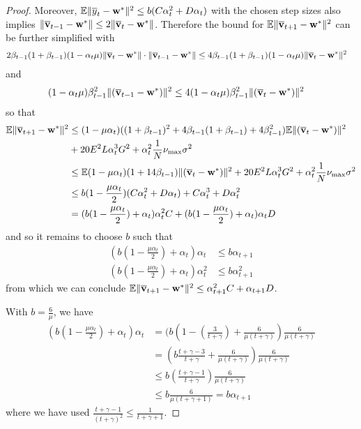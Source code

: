 \begin{proof}
Moreover, $\mathbb{E}\|\overline{y}_{t}-{\mathbf{w}}^{\ast}\|^{2}\leq b(C\alpha_{t}^{2}+D\alpha_{t})$
with the chosen step sizes also implies $\|{\overline{\mathbf{v}}}_{t-1}-{\mathbf{w}}^{\ast}\|\leq2\|{\overline{\mathbf{v}}}_{t}-{\mathbf{w}}^{\ast}\|$.
Therefore the bound for $\mathbb{E}\|{\overline{\mathbf{v}}}_{t+1}-{\mathbf{w}}^{\ast}\|^{2}$
can be further simplified with 
\begin{align*}
2\beta_{t-1}(1+\beta_{t-1})(1-\alpha_{t}\mu)\|{\overline{\mathbf{v}}}_{t}-{\mathbf{w}}^{\ast}\|\cdot\|{\overline{\mathbf{v}}}_{t-1}-{\mathbf{w}}^{\ast}\| & \leq4\beta_{t-1}(1+\beta_{t-1})(1-\alpha_{t}\mu)\|{\overline{\mathbf{v}}}_{t}-{\mathbf{w}}^{\ast}\|^{2}
\end{align*}
and 
\begin{align*}
(1-\alpha_{t}\mu)\beta_{t-1}^{2}\|({\overline{\mathbf{v}}}_{t-1}-{\mathbf{w}}^{\ast})\|^{2} & \leq4(1-\alpha_{t}\mu)\beta_{t-1}^{2}\|({\overline{\mathbf{v}}}_{t}-{\mathbf{w}}^{\ast})\|^{2}
\end{align*}
so that
\begin{align*}
\mathbb{E}\|{\overline{\mathbf{v}}}_{t+1}-{\mathbf{w}}^{\ast}\|^{2} & \leq(1-\mu\alpha_{t})((1+\beta_{t-1})^{2}+4\beta_{t-1}(1+\beta_{t-1})+4\beta_{t-1}^{2})\mathbb{E}\|({\overline{\mathbf{v}}}_{t}-{\mathbf{w}}^{\ast})\|^{2}\\
& +20E^{2}L\alpha_{t}^{3}G^{2}+\alpha_{t}^{2}\frac{1}{N}\nu_{\max}\sigma^{2}\\
& \leq\mathbb{E}(1-\mu\alpha_{t})(1+14\beta_{t-1})\|({\overline{\mathbf{v}}}_{t}-{\mathbf{w}}^{\ast})\|^{2}+20E^{2}L\alpha_{t}^{3}G^{2}+\alpha_{t}^{2}\frac{1}{N}\nu_{\max}\sigma^{2}\\
& \leq b(1-\frac{\mu\alpha_{t}}{2})(C\alpha_{t}^{2}+D\alpha_{t})+C\alpha_{t}^{3}+D\alpha_{t}^{2}\\
& =(b(1-\frac{\mu\alpha_{t}}{2})+\alpha_{t})\alpha_{t}^{2}C+(b(1-\frac{\mu\alpha_{t}}{2})+\alpha_{t})\alpha_{t}D
\end{align*}
and so it remains to choose $b$ such that 
\begin{align*}
(b(1-\frac{\mu\alpha_{t}}{2})+\alpha_{t})\alpha_{t} & \leq b\alpha_{t+1}\\
(b(1-\frac{\mu\alpha_{t}}{2})+\alpha_{t})\alpha_{t}^{2} & \leq b\alpha_{t+1}^{2}
\end{align*}
from which we can conclude $\mathbb{E}\|{\overline{\mathbf{v}}}_{t+1}-{\mathbf{w}}^{\ast}\|^{2}\leq\alpha_{t+1}^{2}C+\alpha_{t+1}D$.

With $b=\frac{6}{\mu}$, we have
\begin{align*}
(b(1-\frac{\mu\alpha_{t}}{2})+\alpha_{t})\alpha_{t} & =(b(1-(\frac{3}{t+\gamma})+\frac{6}{\mu(t+\gamma)})\frac{6}{\mu(t+\gamma)}\\
& =(b\frac{t+\gamma-3}{t+\gamma}+\frac{6}{\mu(t+\gamma)})\frac{6}{\mu(t+\gamma)}\\
& \leq b(\frac{t+\gamma-1}{t+\gamma})\frac{6}{\mu(t+\gamma)}\\
& \leq b\frac{6}{\mu(t+\gamma+1)}=b\alpha_{t+1}
\end{align*}
where we have used $\frac{t+\gamma-1}{(t+\gamma)^{2}}\leq\frac{1}{t+\gamma+1}$.


\end{proof}
